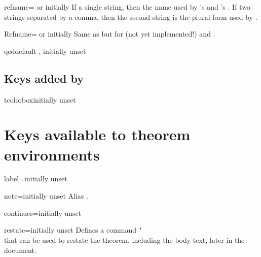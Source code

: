 \documentclass{ltxdoc}
\begin{document}
\begin{docKey}{refname}{= or }{initially }
If a single string, then the name used by 's  and 's . If two strings separated by a comma, then the second string is the plural form used by .
\end{docKey}

\begin{docKey}{Refname}{= or }{initially }
Same as  but for  (not yet implemented!) and .
\end{docKey}

\begin{docKey}{qed}{}{default , initially unset}

\end{docKey}

\subsection{Keys added by }

\begin{docKey}{tcolorbox}{}{initially unset}

\end{docKey}

\section{Keys available to theorem environments} \label{in-doc-keys}

\begin{docKey}{label}{=}{initially unset}

\end{docKey}

\begin{docKey}{note}{=}{initially unset}
Alias .
\end{docKey}

\begin{docKey}{continues}{=}{initially unset}

\end{docKey}

\begin{docKey}{restate}{=}{initially unset}
Defines a command \texttt{\char`\\} that can be used to restate the theorem, including the body text, later in the document.
\end{docKey}
\end{document}
